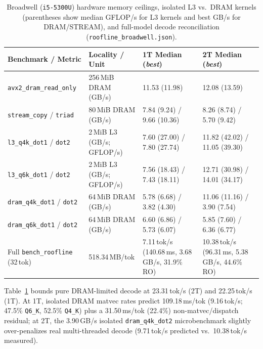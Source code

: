 \documentclass[11pt,a4paper]{article}
\begin{document}
\begin{table}[h]
\centering
\footnotesize
\setlength{\tabcolsep}{4pt}
\begin{tabular}{@{}llll@{}}
\toprule
Benchmark / Metric & Locality / Unit & 1T Median (\emph{best}) & 2T Median (\emph{best}) \\
\midrule
\texttt{avx2\_dram\_read\_only} & 256\,MiB DRAM (GB/s) & 11.53 (11.98) & 12.08 (13.59) \\
\texttt{stream\_copy} / \texttt{triad} & 80\,MiB DRAM (GB/s) & 7.84 (9.24) / 9.66 (10.36) & 8.26 (8.74) / 5.70 (9.42) \\
\texttt{l3\_q4k\_dot1} / \texttt{dot2} & 2\,MiB L3 (GB/s; GFLOP/s) & 7.60 (27.00) / 7.80 (27.74) & 11.82 (42.02) / 11.05 (39.30) \\
\texttt{l3\_q6k\_dot1} / \texttt{dot2} & 2\,MiB L3 (GB/s; GFLOP/s) & 7.56 (18.43) / 7.43 (18.11) & 12.71 (30.98) / 14.01 (34.17) \\
\texttt{dram\_q4k\_dot1} / \texttt{dot2} & 64\,MiB DRAM (GB/s) & 5.78 (6.68) / 3.82 (4.30) & 11.06 (11.16) / 3.90 (7.54) \\
\texttt{dram\_q6k\_dot1} / \texttt{dot2} & 64\,MiB DRAM (GB/s) & 6.60 (6.86) / 5.73 (6.07) & 5.85 (7.60) / 6.36 (6.77) \\
Full \texttt{bench\_roofline} (32\,tok) & 518.34\,MB/tok & 7.11\,tok/s (140.68\,ms, 3.68\,GB/s, 31.9\% RO) & 10.38\,tok/s (96.31\,ms, 5.38\,GB/s, 44.6\% RO) \\
\bottomrule
\end{tabular}
\caption{Broadwell (\texttt{i5-5300U}) hardware memory ceilings, isolated L3 vs.\ DRAM kernels (parentheses show median GFLOP/s for L3 kernels and best GB/s for DRAM/STREAM), and full-model decode reconciliation (\texttt{roofline\_broadwell.json}).}
\label{tab:roofline}
\end{table}

Table~\ref{tab:roofline} bounds pure DRAM-limited decode at 23.31\,tok/s (2T) and 22.25\,tok/s (1T). At 1T, isolated DRAM matvec rates predict 109.18\,ms/tok (9.16\,tok/s; 47.5\% \texttt{Q6\_K}, 52.5\% \texttt{Q4\_K}) plus a 31.50\,ms/tok (22.4\%) non-matvec/dispatch residual; at 2T, the 3.90\,GB/s isolated \texttt{dram\_q4k\_dot2} microbenchmark slightly over-penalizes real multi-threaded decode (9.71\,tok/s predicted vs.\ 10.38\,tok/s measured).
\end{document}
